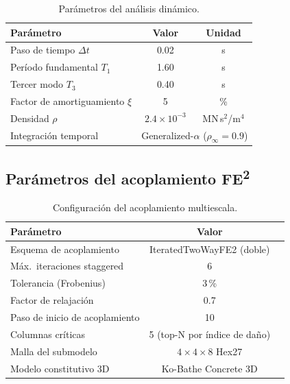 \begin{table}[htbp]
  \centering
  \caption{Parámetros del análisis dinámico.}
  \label{tab:ms16-dyn-params}
  \begin{tabular}{lcc}
    \toprule
    Parámetro & Valor & Unidad \\
    \midrule
    Paso de tiempo $\Delta t$        & 0.02  & s \\
    Período fundamental $T_1$        & 1.60  & s \\
    Tercer modo $T_3$                & 0.40  & s \\
    Factor de amortiguamiento $\xi$  & 5     & \% \\
    Densidad $\rho$                  & $2.4\times10^{-3}$ & MN\,s$^2$/m$^4$ \\
    Integración temporal             & \multicolumn{2}{c}{Generalized-$\alpha$ ($\rho_\infty=0.9$)} \\
    \bottomrule
  \end{tabular}
\end{table}

\subsection{Parámetros del acoplamiento FE\textsuperscript{2}}

\begin{table}[htbp]
  \centering
  \caption{Configuración del acoplamiento multiescala.}
  \label{tab:ms16-fe2-params}
  \begin{tabular}{lcc}
    \toprule
    Parámetro & Valor \\
    \midrule
    Esquema de acoplamiento     & IteratedTwoWayFE2 (doble) \\
    Máx.\ iteraciones staggered & 6 \\
    Tolerancia (Frobenius)      & 3\,\% \\
    Factor de relajación        & 0.7 \\
    Paso de inicio de acoplamiento & 10 \\
    Columnas críticas           & 5 (top-N por índice de daño) \\
    Malla del submodelo         & $4\times4\times8$ Hex27 \\
    Modelo constitutivo 3D      & Ko-Bathe Concrete 3D \\
    \bottomrule
  \end{tabular}
\end{table}


